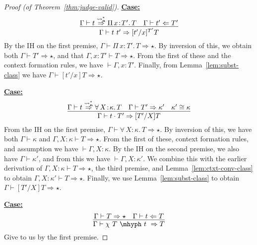\documentclass{article}
\newcommand{\abs}[4]{{#1}\, #2\! : \! #3.\, #4}
\newcommand{\leadstocs}[0]{\ensuremath{\leadsto_{\mathbf{n}}^*}}
\newcommand{\tpcheck}[0]{\Leftarrow}
\newcommand{\tpsynth}[0]{\Rightarrow}
\newcommand{\tpsynthleads}[0]{\ensuremath{\overset{\leadstocs}{\Rightarrow}}}
\newcommand{\startcase}[1]{\vspace{#1} \noindent\textbf{\underline{Case:}}}
\begin{document}
\begin{proof}[Proof (of Theorem~\ref{thm:judge-valid})]
  \startcase{.2cm}
  \[
    \infer{\Gamma\vdash t\ t' \tpsynth [t'/x]^{T'}T}{\Gamma\vdash t \tpsynthleads \abs{\Pi}{x}{T'}{T} & \Gamma\vdash t' \tpcheck T'}
  \]
  By the IH on the first premise, \(\Gamma \vdash \abs{\Pi}{x}{T'}{T} \tpsynth
  \star\).
  By inversion of this, we obtain both \(\Gamma \vdash T' \tpsynth \star\), and
  that \(\Gamma,x:T' \vdash T \tpsynth \star\).
  From the first of these and the context formation rules, we have \(\vdash
  \Gamma,x:T'\).
  Finally, from Lemma~\ref{lem:subst-class} we have \(\Gamma \vdash [t'/x]T
  \tpsynth \star\).

  \startcase{.2cm}
  \[
    \infer{
      \Gamma\vdash t \cdot T' \tpsynth [T'/X]T
    }{
      \Gamma\vdash t \tpsynthleads \abs{\forall}{X}{\kappa}{T} & \Gamma\vdash T'
      \tpsynth \kappa' & \kappa'\cong\kappa
    }
  \]
  From the IH on the first premise, \(\Gamma \vdash \abs{\forall}{X}{\kappa}{T}
  \tpsynth \star\).
  By inversion of this, we have both \(\Gamma \vdash \kappa\) and
  \(\Gamma,X:\kappa \vdash T \tpsynth \star\).
  From the first of these, context formation rules, and assumption we have
  \(\vdash \Gamma,X:\kappa\).
  By the IH on the second premise, we also have \(\Gamma \vdash \kappa'\), and
  from this we have \(\vdash \Gamma,X:\kappa'\).
  We combine this with the earlier derivation of \(\Gamma,X:\kappa \vdash T
  \tpsynth \star\), the third premise, and Lemma~\ref{lem:ctxt-conv-class} to
  obtain \(\Gamma,X:\kappa' \vdash T \tpsynth \star\).
  Finally, we use Lemma~\ref{lem:subst-class} to obtain \(\Gamma \vdash [T'/X]T
  \tpsynth \star\).
  



  \startcase{.2cm}
  \[
    \infer{\Gamma \vdash \chi\ T\ \mhyph\ t\ \tpsynth T}
    {\Gamma \vdash T \tpsynth \star & \Gamma \vdash t \tpcheck T}
  \]
  Give to us by the first premise.
\end{proof}
\end{document}
